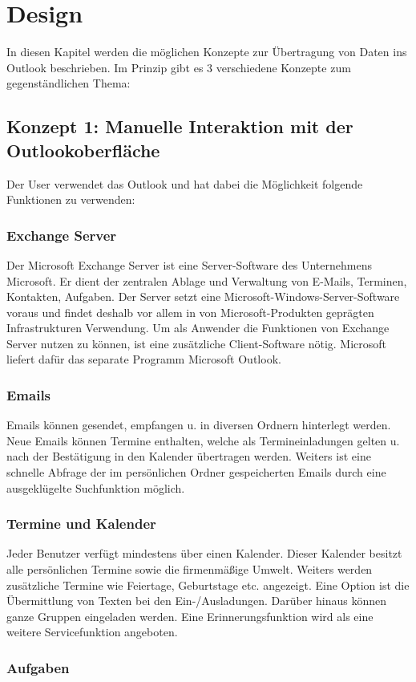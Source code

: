 \chapter{Design}
In diesen Kapitel werden die möglichen Konzepte zur Übertragung von Daten ins Outlook beschrieben. Im Prinzip gibt es 3 verschiedene Konzepte zum gegenständlichen Thema:
\section{Konzept 1: Manuelle Interaktion mit der Outlookoberfläche}
Der User verwendet das Outlook und hat dabei die Möglichkeit folgende Funktionen zu verwenden:
\subsection{Exchange Server}
Der Microsoft Exchange Server ist eine Server-Software des Unternehmens Microsoft. Er dient der zentralen Ablage und Verwaltung von E-Mails, Terminen, Kontakten, Aufgaben. Der  Server setzt eine Microsoft-Windows-Server-Software voraus und findet deshalb vor allem in von Microsoft-Produkten geprägten Infrastrukturen Verwendung. Um als Anwender die Funktionen von Exchange Server nutzen zu können, ist eine zusätzliche Client-Software nötig. Microsoft liefert dafür das separate Programm Microsoft Outlook.
\subsection{Emails}
Emails können gesendet, empfangen u. in diversen Ordnern hinterlegt werden. Neue Emails können Termine enthalten, welche als Termineinladungen gelten u. nach der Bestätigung in den Kalender übertragen werden. Weiters ist eine schnelle Abfrage der im persönlichen Ordner gespeicherten Emails durch eine ausgeklügelte Suchfunktion möglich.
\subsection{Termine und Kalender}
Jeder Benutzer verfügt mindestens über einen Kalender. Dieser Kalender besitzt alle persönlichen Termine sowie die firmenmäßige Umwelt. Weiters werden zusätzliche Termine wie Feiertage, Geburtstage etc. angezeigt. Eine Option ist die Übermittlung von Texten bei den Ein-/Ausladungen.
Darüber hinaus können ganze Gruppen eingeladen werden. Eine Erinnerungsfunktion wird als eine weitere Servicefunktion angeboten.
\subsection{Aufgaben}

